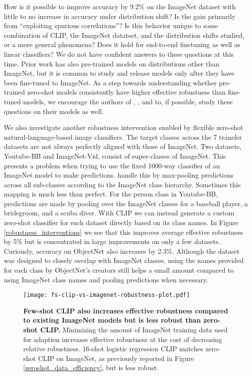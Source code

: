 \documentclass{article}
\begin{document}
How is it possible to improve accuracy by 9.2\% on the ImageNet dataset with little to no increase in accuracy under distribution shift? Is the gain primarily from ``exploiting spurious correlations''? Is this behavior unique to some combination of CLIP, the ImageNet datatset, and the distribution shifts studied, or a more general phenomena? Does it hold for end-to-end finetuning as well as linear classifiers? We do not have confident answers to these questions at this time. Prior work has also pre-trained models on distributions other than ImageNet, but it is common to study and release models only after they have been fine-tuned to ImageNet. As a step towards understanding whether pre-trained zero-shot models consistently have higher effective robustness than fine-tuned models, we encourage the authors of \citet{mahajan2018exploring}, \citet{kolesnikov2019large}, and \citet{dosovitskiy2020image} to, if possible, study these questions on their models as well.

We also investigate another robustness intervention enabled by flexible zero-shot natural-language-based image classifiers. The target classes across the 7 transfer datasets are not always perfectly aligned with those of ImageNet. Two datasets, Youtube-BB and ImageNet-Vid, consist of super-classes of ImageNet. This presents a problem when trying to use the fixed 1000-way classifier of an ImageNet model to make predictions. \citet{taori2020measuring} handle this by max-pooling predictions across all sub-classes according to the ImageNet class hierarchy. Sometimes this mapping is much less than perfect. For the person class in Youtube-BB, predictions are made by pooling over the ImageNet classes for a baseball player, a bridegroom, and a scuba diver. With CLIP we can instead generate a custom zero-shot classifier for each dataset directly based on its class names. In Figure \ref{robustness_interventions} we see that this improves average effective robustness by 5\% but is concentrated in large improvements on only a few datasets. Curiously, accuracy on ObjectNet also increases by 2.3\%. Although the dataset was designed to closely overlap with ImageNet classes, using the names provided for each class by ObjectNet's creators still helps a small amount compared to using ImageNet class names and pooling predictions when necessary.

\begin{figure}[t]
\begin{center}
\centerline{\texttt{[image: fs-clip-vs-imagenet-robustness-plot.pdf]}}
\caption{\textbf{Few-shot CLIP also increases effective robustness compared to existing ImageNet models but is less robust than zero-shot CLIP.} Minimizing the amount of ImageNet training data used for adaption increases effective robustness at the cost of decreasing relative robustness. 16-shot logistic regression CLIP matches zero-shot CLIP on ImageNet, as previously reported in Figure \ref{zeroshot_data_efficiency}, but is less robust.}
\label{few_shot_robustness}
\end{center}
\end{figure}
\end{document}

